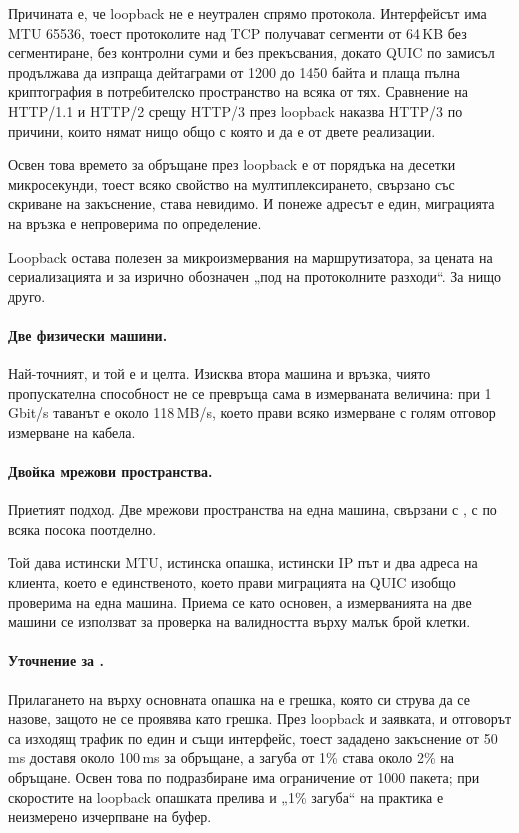 Причината е, че loopback не е неутрален спрямо протокола. Интерфейсът  има MTU
65536, тоест протоколите над TCP получават сегменти от 64\,KB без сегментиране, без
контролни суми и без прекъсвания, докато QUIC по замисъл продължава да изпраща дейтаграми
от 1200 до 1450 байта и плаща пълна криптография в потребителско пространство на всяка от
тях. Сравнение на HTTP/1.1 и HTTP/2 срещу HTTP/3 през loopback наказва HTTP/3 по причини,
които нямат нищо общо с която и да е от двете реализации.

Освен това времето за обръщане през loopback е от порядъка на десетки микросекунди, тоест
всяко свойство на мултиплексирането, свързано със скриване на закъснение, става невидимо. И
понеже адресът е един, миграцията на връзка е непроверима по определение.

Loopback остава полезен за микроизмервания на маршрутизатора, за цената на сериализацията и
за изрично обозначен „под на протоколните разходи“. За нищо друго.

\paragraph{Две физически машини.} Най-точният, и той е и целта. Изисква втора машина и
връзка, чиято пропускателна способност не се превръща сама в измерваната величина: при
1\,Gbit/s таванът е около 118\,MB/s, което прави всяко измерване с голям отговор измерване
на кабела.

\paragraph{Двойка мрежови пространства.} Приетият подход. Две мрежови пространства на една
машина, свързани с , с  по всяка посока поотделно.



Той дава истински MTU, истинска опашка, истински IP път и два адреса на клиента, което е
единственото, което прави миграцията на QUIC изобщо проверима на една машина. Приема се
като основен, а измерванията на две машини се използват за проверка на валидността върху
малък брой клетки.

\paragraph{Уточнение за .} Прилагането на  върху основната опашка
на  е грешка, която си струва да се назове, защото не се проявява като грешка.
През loopback и заявката, и отговорът са изходящ трафик по един и същи интерфейс, тоест
зададено закъснение от 50\,ms доставя около 100\,ms за обръщане, а загуба от 1\% става
около 2\% на обръщане. Освен това  по подразбиране има ограничение от 1000
пакета; при скоростите на loopback опашката прелива и „1\% загуба“ на практика е неизмерено
изчерпване на буфер.

